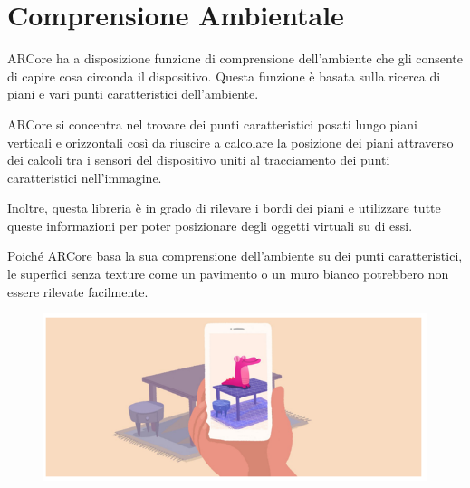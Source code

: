 \documentclass[crop=false, class=book]{standalone}
\begin{document}
	\chapter{Comprensione Ambientale}
	
	
	
ARCore ha a disposizione funzione di comprensione dell’ambiente che gli consente di capire cosa circonda il dispositivo. Questa funzione è basata sulla ricerca di piani e vari punti caratteristici dell’ambiente.

ARCore si concentra nel trovare dei punti caratteristici posati lungo piani verticali e orizzontali così da riuscire a calcolare la posizione dei piani attraverso dei calcoli tra i sensori del dispositivo uniti al tracciamento dei punti caratteristici nell’immagine. 

Inoltre, questa libreria è in grado di rilevare i bordi dei piani e utilizzare tutte queste informazioni per poter posizionare degli oggetti virtuali su di essi.

Poiché ARCore basa la sua comprensione dell’ambiente su dei punti caratteristici, le superfici senza texture come un pavimento o un muro bianco potrebbero non essere rilevate facilmente.

\begin{center}
\begin{figure}[hbtp]
\centering
\includegraphics[width=\textwidth]{Immagine1.png}
\end{figure}



\end{center}



	 
\end{document}
